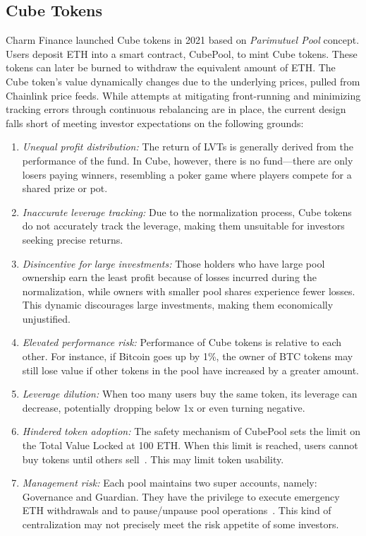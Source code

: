 \subsection{Cube Tokens}\label{subsec:cube}
Charm Finance launched Cube tokens in 2021 based on \textit{Parimutuel Pool} concept. Users deposit ETH into a smart contract, CubePool, to mint Cube tokens. These tokens can later be burned to withdraw the equivalent amount of ETH. The Cube token's value dynamically changes due to the underlying prices, pulled from Chainlink price feeds. While attempts at mitigating front-running and minimizing tracking errors through continuous rebalancing are in place, the current design falls short of meeting investor expectations on the following grounds:
\begin{enumerate}[label={\ref{subsec:cube}.\arabic*},leftmargin=*]
	\item \textit{Unequal profit distribution:} The return of LVTs is generally derived from the performance of the fund. In Cube, however, there is no fund—there are only losers paying winners, resembling a poker game where players compete for a shared prize or pot.
	
	\item \textit{Inaccurate leverage tracking:} Due to the normalization process, Cube tokens do not accurately track the leverage, making them unsuitable for investors seeking precise returns.
	
	\item \textit{Disincentive for large investments:} Those holders who have large pool ownership earn the least profit because of losses incurred during the normalization, while owners with smaller pool shares experience fewer losses. This dynamic discourages large investments, making them economically unjustified.
	
	\item \textit{Elevated performance risk:} Performance of Cube tokens is relative to each other. For instance, if Bitcoin goes up by 1\%, the owner of BTC tokens may still lose value if other tokens in the pool have increased by a greater amount.
	
	\item \textit{Leverage dilution:} When too many users buy the same token, its leverage can decrease, potentially dropping below 1x or even turning negative.
	
	\item \textit{Hindered token adoption:} The safety mechanism of CubePool sets the limit on the Total Value Locked at 100 ETH. When this limit is reached, users cannot buy tokens until others sell~\cite{Cube_Github}. This may limit token usability.
	
	\item \textit{Management risk:} Each pool maintains two super accounts, namely: Governance and Guardian. They have the privilege to execute emergency ETH withdrawals and to pause/unpause pool operations~\cite{Cube_Faq}. This kind of centralization may not precisely meet the risk appetite of some investors.
\end{enumerate}

